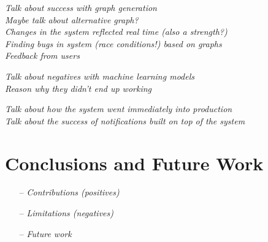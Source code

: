 \documentclass[english,12pt,a4paper,pdftex,sci,utf8]{aaltothesis}
\theoremstyle{definition}
\newcommand{\nyi}[1]{\noindent\colorbox{nyibg}{\textcolor{nyitext}{\emph{#1}}}}
\begin{document}

\nyi{Talk about success with graph generation}\\
\nyi{Maybe talk about alternative graph?}\\
\nyi{Changes in the system reflected real time (also a strength?)}\\
\nyi{Finding bugs in system (race conditions!) based on graphs}\\
\nyi{Feedback from users}

\nyi{Talk about negatives with machine learning models}\\
\nyi{Reason why they didn't end up working}

\nyi{Talk about how the system went immediately into production}\\
\nyi{Talk about the success of notifications built on top of the system}


\clearpage
\section{Conclusions and Future Work} 
\label{sec:conclusions}

\begin{itemize}
\item[--]\nyi{Contributions (positives)}
\item[--]\nyi{Limitations (negatives)}
\item[--]\nyi{Future work}
\end{itemize}


\clearpage

{}

\printbibliography

\end{document}

